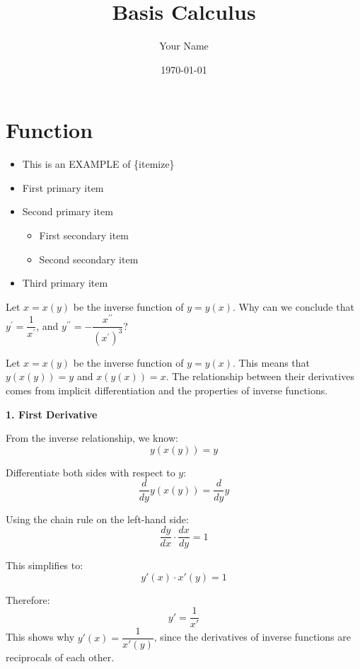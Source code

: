 \documentclass[a4paper,12pt]{book}
\begin{document}
	
\title{Basis Calculus}
\author{Your Name}
\date{\today}

\maketitle

\tableofcontents

\newpage

\chapter{Function}

\begin{itemize}[label=\textbullet] %
	\item This is an EXAMPLE of \{itemize\}
	\item First primary item
	\item Second primary item
	\begin{itemize}[label=\(\circ\), left=1.5em] %
		\item First secondary item
		\item Second secondary item
	\end{itemize}
	\item Third primary item
\end{itemize}
	
\begin{bluebox}
Let \(x=x(y)\) be the inverse function of \(y=y(x)\). Why can we conclude that \(y^{\prime}=\dfrac{1}{x^{\prime}}\), and \(y^{\prime\prime}=-\dfrac{x^{\prime\prime}}{(x^{\prime})^3}\)?
\end{bluebox}


Let \( x = x(y) \) be the inverse function of \( y = y(x) \). This means that \( y(x(y)) = y \) and \( x(y(x)) = x \). The relationship between their derivatives comes from implicit differentiation and the properties of inverse functions.

\textbf{1. First Derivative}

From the inverse relationship, we know:
\[
y(x(y)) = y
\]

Differentiate both sides with respect to \( y \):
\[
\dfrac{d}{dy} y(x(y)) = \dfrac{d}{dy} y
\]

Using the chain rule on the left-hand side:
\[
\dfrac{dy}{dx} \cdot \dfrac{dx}{dy} = 1
\]

This simplifies to:
\[
y'(x) \cdot x'(y) = 1
\]

Therefore:
\[
y' = \dfrac{1}{x'}
\]
This shows why \( y'(x) = \dfrac{1}{x'(y)} \), since the derivatives of inverse functions are reciprocals of each other.
\end{document}
